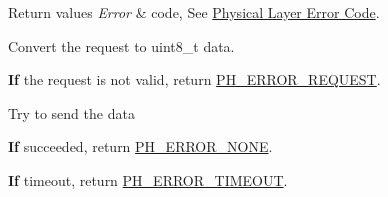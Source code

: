 \begin{DoxyRetVals}{Return values}
{\em Error} & code, See \hyperlink{group___p_h___error___code}{Physical Layer Error Code}. \\
\hline
\end{DoxyRetVals}
Convert the request to {\ttfamily uint8\+\_\+t} data.

{\bfseries If} the request is not valid, return \hyperlink{group___p_h___error___code_ga76393e5665e76130e95c73aab378c53d}{P\+H\+\_\+\+E\+R\+R\+O\+R\+\_\+\+R\+E\+Q\+U\+E\+ST}.

Try to send the data

{\bfseries If} succeeded, return \hyperlink{group___p_h___error___code_ga67055c114ec03135c28e1cb6a3d68f5a}{P\+H\+\_\+\+E\+R\+R\+O\+R\+\_\+\+N\+O\+NE}.

{\bfseries If} timeout, return \hyperlink{group___p_h___error___code_gaae8d2172a18fdde6957c77af378c2574}{P\+H\+\_\+\+E\+R\+R\+O\+R\+\_\+\+T\+I\+M\+E\+O\+UT}. 